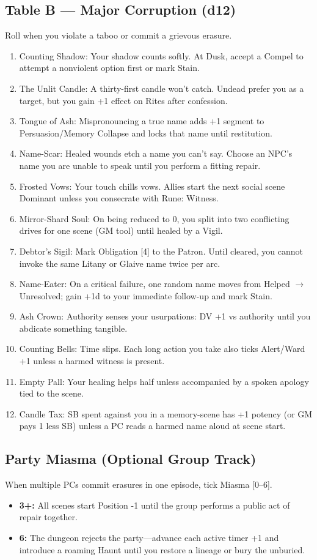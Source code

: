 \documentclass[18pt, letterpaper, twoside]{article}
\newcommand{\corruptiontitle}[1]{\subsection*{#1}}
\begin{document}
\begin{enumerate}
\corruptiontitle{Table B --- Major Corruption (d12)}
Roll when you violate a taboo or commit a grievous erasure.
\begin{enumerate}
    \item Counting Shadow: Your shadow counts softly. At Dusk, accept a Compel to attempt a nonviolent option first or mark Stain.
    \item The Unlit Candle: A thirty-first candle won't catch. Undead prefer you as a target, but you gain +1 effect on Rites after confession.
    \item Tongue of Ash: Mispronouncing a true name adds +1 segment to Persuasion/Memory Collapse and locks that name until restitution.
    \item Name-Scar: Healed wounds etch a name you can't say. Choose an NPC's name you are unable to speak until you perform a fitting repair.
    \item Frosted Vows: Your touch chills vows. Allies start the next social scene Dominant unless you consecrate with Rune: Witness.
    \item Mirror-Shard Soul: On being reduced to 0, you split into two conflicting drives for one scene (GM tool) until healed by a Vigil.
    \item Debtor's Sigil: Mark Obligation [4] to the Patron. Until cleared, you cannot invoke the same Litany or Glaive name twice per arc.
    \item Name-Eater: On a critical failure, one random name moves from Helped $\rightarrow$ Unresolved; gain +1d to your immediate follow-up and mark Stain.
    \item Ash Crown: Authority senses your usurpations: DV +1 vs authority until you abdicate something tangible.
    \item Counting Bells: Time slips. Each long action you take also ticks Alert/Ward +1 unless a harmed witness is present.
    \item Empty Pall: Your healing helps half unless accompanied by a spoken apology tied to the scene.
    \item Candle Tax: SB spent against you in a memory-scene has +1 potency (or GM pays 1 less SB) unless a PC reads a harmed name aloud at scene start.
\end{enumerate}

\corruptiontitle{Party Miasma (Optional Group Track)}
When multiple PCs commit erasures in one episode, tick Miasma [0--6].
\begin{itemize}
    \item \textbf{3+:} All scenes start Position -1 until the group performs a public act of repair together.
    \item \textbf{6:} The dungeon rejects the party---advance each active timer +1 and introduce a roaming Haunt until you restore a lineage or bury the unburied.
\end{itemize}


\end{enumerate}
\end{document}
